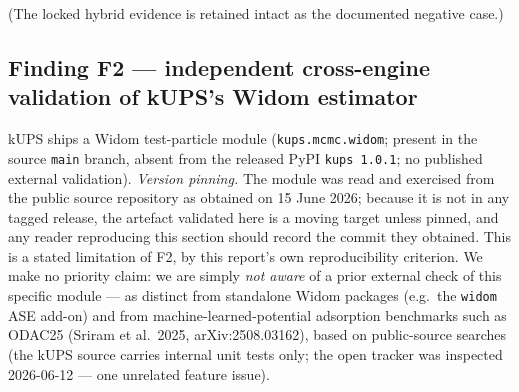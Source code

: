(The locked hybrid evidence is retained intact as the documented
negative case.)

\subsection{Finding F2 --- independent cross-engine validation of
kUPS's Widom estimator}\label{finding-f2-the-first-published-independent-validation-of-kupss-widom-estimator}

kUPS ships a Widom test-particle module (\texttt{kups.mcmc.widom}; present
in the source \texttt{main} branch, absent from the released PyPI
\texttt{kups\ 1.0.1}; no published external validation). \emph{Version
pinning.} The module was read and exercised from the public source
repository as obtained on 15 June 2026; because it is not in any tagged
release, the artefact validated here is a moving target unless pinned,
and any reader reproducing this section should record the commit they
obtained. This is a stated limitation of F2, by this report's own
reproducibility criterion. We make no priority claim: we are simply
\emph{not aware} of a prior external check of this specific module ---
as distinct from standalone Widom packages (e.g.\ the
\texttt{widom} ASE add-on) and from machine-learned-potential adsorption
benchmarks such as ODAC25 (Sriram et al.\ 2025, arXiv:2508.03162), based on public-source
searches (the kUPS source carries internal unit tests only; the open
tracker was inspected 2026-06-12 --- one unrelated feature issue).


